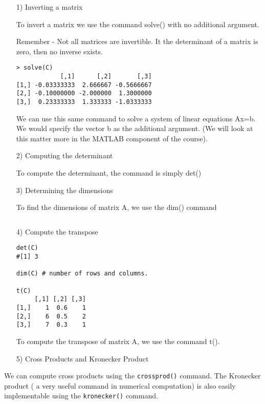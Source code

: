 \documentclass[a4paper,12pt]{article}
\begin{document}
\begin{itemize}
\item[1)] Inverting a matrix

To invert a matrix we use the command solve() with no additional argument.

Remember - Not all matrices are invertible.  It the determinant of a matrix is zero, then no inverse exists.

\begin{framed}
\begin{verbatim}
> solve(C)
            [,1]      [,2]       [,3]
[1,] -0.03333333  2.666667 -0.5666667
[2,] -0.10000000 -2.000000  1.3000000
[3,]  0.23333333  1.333333 -1.0333333
\end{verbatim}
\end{framed}


We can use this same command to solve a system of linear equations Ax=b. We would specify the vector b as the additional argument.
(We will look at this matter more in the MATLAB component of the course).

\item[2)] Computing the determinant

To compute the determinant, the command is simply det()


\item[3)] Determining the dimensions

To find the dimensions of matrix A, we use the dim() command
\begin{framed}
\begin{verbatim}
\end{verbatim}
\end{framed}

\item[4)] Compute the transpose

\begin{framed}
\begin{verbatim}
det(C)
#[1] 3

dim(C) # number of rows and columns.

t(C)
     [,1] [,2] [,3]
[1,]    1  0.6    1
[2,]    6  0.5    2
[3,]    7  0.3    1

\end{verbatim}
\end{framed}
 To compute the transpose of matrix A, we use the command t().



\item[5)] Cross Products and Kronecker Product

\end{itemize}
We can compute cross products using the \texttt{crossprod()} command. 
The Kronecker product ( a very useful command in numerical computation) 
is also easily implementable using the \texttt{kronecker()} command.
\end{document}
